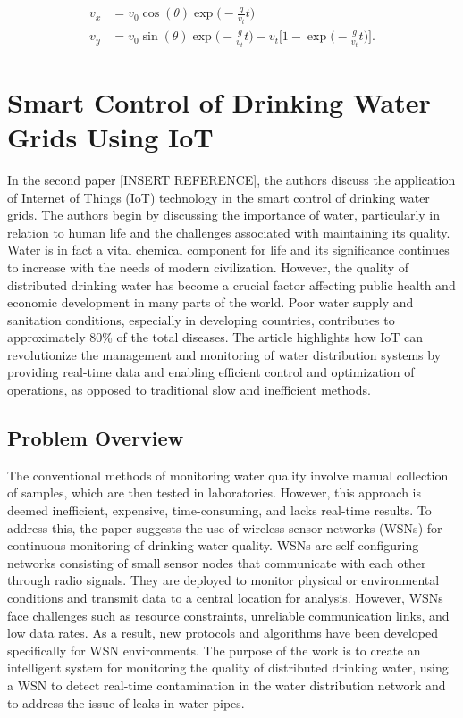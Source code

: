 \documentclass[draft, {\secondLanguage}, english]{volcanica-template}
\begin{document}
\begin{subequations}
\begin{align}
v_x &= v_0 \cos(\theta)\exp\bigg(-\frac{g}{v_t}t\bigg) \label{eq:2a}\\[0.5ex]
v_y &=v_0\sin(\theta)\exp\bigg(-\frac{g}{v_t}t\bigg)-v_t\bigg[1-\exp\bigg(-\frac{g}{v_t}t\bigg)\bigg]. \label{eq:2b}\end{align}
\label{eq:02}
\end{subequations}

\section{Smart Control of Drinking Water Grids Using IoT}
In the second paper [INSERT REFERENCE], the authors discuss the application of Internet of Things (IoT) technology in the smart control of drinking water grids. The authors begin by discussing the importance of water, particularly in relation to human life and the challenges associated with maintaining its quality. Water is in fact a vital chemical component for life and its significance continues to increase with the needs of modern civilization. However, the quality of distributed drinking water has become a crucial factor affecting public health and economic development in many parts of the world. Poor water supply and sanitation conditions, especially in developing countries, contributes to approximately 80\% of the total diseases. The article highlights how IoT can revolutionize the management and monitoring of water distribution systems by providing real-time data and enabling efficient control and optimization of operations, as opposed to traditional slow and inefficient methods.

\subsection{Problem Overview}
The conventional methods of monitoring water quality involve manual collection of samples, which are then tested in laboratories. However, this approach is deemed inefficient, expensive, time-consuming, and lacks real-time results. To address this, the paper suggests the use of wireless sensor networks (WSNs) for continuous monitoring of drinking water quality. WSNs are self-configuring networks consisting of small sensor nodes that communicate with each other through radio signals. They are deployed to monitor physical or environmental conditions and transmit data to a central location for analysis. However, WSNs face challenges such as resource constraints, unreliable communication links, and low data rates. As a result, new protocols and algorithms have been developed specifically for WSN environments. The purpose of the work is to create an intelligent system for monitoring the quality of distributed drinking water, using a WSN to detect real-time contamination in the water distribution network and to address the issue of leaks in water pipes.
\end{document}
